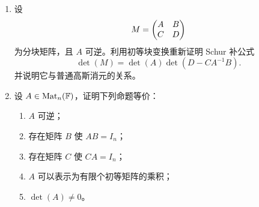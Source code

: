 \begin{enumerate}[label=\arabic*.,start=51]
  \item \hard 设
  \[
  M=\begin{pmatrix} A&B\\C&D \end{pmatrix}
  \]
  为分块矩阵，且 $A$ 可逆。利用初等块变换重新证明 Schur 补公式
  \[
  \det(M)=\det(A)\det(D-CA^{-1}B).
  \]
  并说明它与普通高斯消元的关系。

  \item \hard 设 $A\in\mathrm{Mat}_n(\mathbb{F})$，证明下列命题等价：
  \begin{enumerate}[label=(\alph*)]
    \item $A$ 可逆；
    \item 存在矩阵 $B$ 使 $AB=I_n$；
    \item 存在矩阵 $C$ 使 $CA=I_n$；
    \item $A$ 可以表示为有限个初等矩阵的乘积；
    \item $\det(A)\ne0$。
  \end{enumerate}
\end{enumerate}

